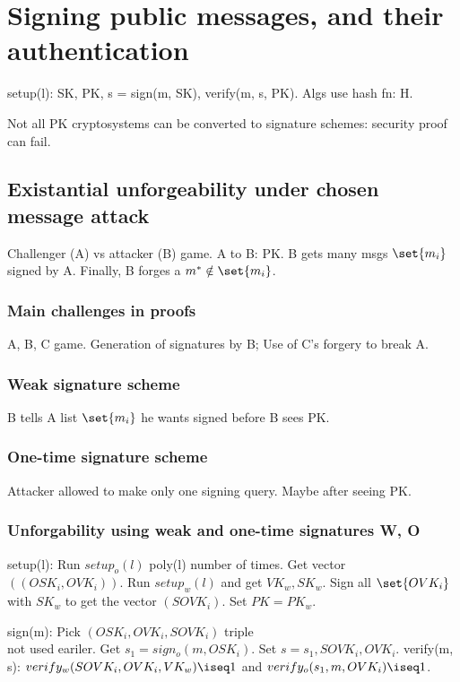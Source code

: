 \documentclass[oneside, article]{memoir}
\begin{document}
\section{Signing public messages, and their authentication}
setup(l): SK, PK, s = sign(m, SK), verify(m, s, PK). Algs use hash fn: H.

Not all PK cryptosystems can be converted to signature schemes: security proof can fail.

\subsection{Existantial unforgeability under chosen message attack}
Challenger (A) vs attacker (B) game. A to B: PK. B gets many msgs $\set{m_{i}}$ signed by A. Finally, B forges a $m^{*} \notin \set{m_{i}}$.

\subsubsection{Main challenges in proofs}
A, B, C game. Generation of signatures by B; Use of C's forgery to break A.

\subsubsection{Weak signature scheme}
B tells A list $\set{m_{i}}$ he wants signed before B sees PK.

\subsubsection{One-time signature scheme}
Attacker allowed to make only one signing query. Maybe after seeing PK.

\subsubsection{Unforgability using weak and one-time signatures W, O}
setup(l): Run $setup_o(l)$ poly(l) number of times. Get vector $((OSK_{i}, OVK_{i}))$. Run $setup_w(l)$ and get $VK_w, SK_w$. Sign all $\set{OVK_{i}}$ with $SK_w$ to get the vector $(SOVK_i)$. Set $PK = PK_w$.

sign(m): Pick $(OSK_{i}, OVK_{i}, SOVK_i)$ triple \\
not used eariler. Get $s_1 = sign_o(m, OSK_{i})$. Set $s = s_1, SOVK_i, OVK_{i}$. verify(m, s): $verify_w(SOVK_i, OVK_{i}, VK_w) \iseq 1$ and $verify_o(s_1, m, OVK_{i}) \iseq 1$.
\end{document}
